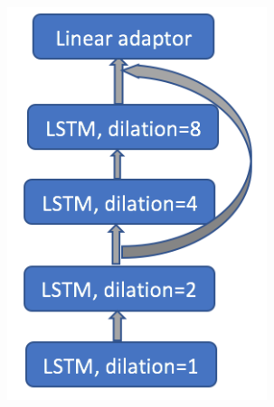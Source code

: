 \documentclass[a4paper,12pt]{article}
\theoremstyle{definition}
\begin{document}
\begin{figure}[ht]
\begin{subfigure}[b]{0.32\textwidth}
		\includegraphics[width=\textwidth]{figures/uber_quarterly.png}
		\caption{}
		\label{fig:uber_quarterly}
	\end{subfigure}
	\begin{subfigure}[b]{0.32\textwidth}

\end{subfigure}
\end{figure}
\end{document}
